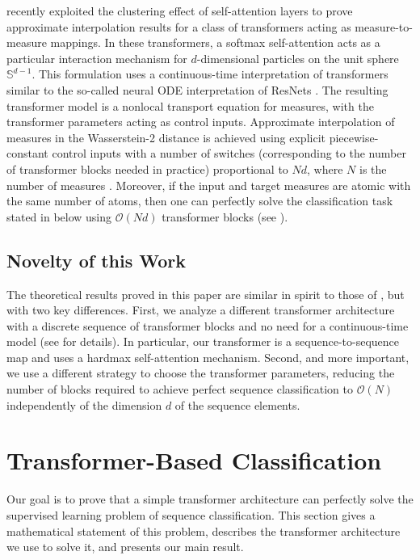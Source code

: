 \documentclass[11pt,a4paper]{amsart}
\begin{document}
\citet{geshkovski2024measure} recently exploited the clustering effect of self-attention layers to prove approximate interpolation results for a class of transformers acting as measure-to-measure mappings. In these transformers, a softmax self-attention acts as a particular interaction mechanism for $d$-dimensional particles on the unit sphere $\mathbb{S}^{d-1}$. This formulation uses a continuous-time interpretation of transformers similar to the so-called neural ODE interpretation of ResNets \cite{Weinan2017APO,NODES2018}. The resulting transformer model is a nonlocal transport equation for measures, with the transformer parameters acting as control inputs. Approximate interpolation of measures in the Wasserstein-2 distance is achieved using explicit piecewise-constant control inputs with a number of switches (corresponding to the number of transformer blocks needed in practice) proportional to $Nd$, where $N$ is the number of measures \citep[Theorem~1.1]{geshkovski2024measure}. Moreover, if the input and target measures are atomic with the same number of atoms, then one can perfectly solve the classification task stated in  below using $\mathcal{O}(Nd)$ transformer blocks (see \cite[\S1.4.2]{geshkovski2024measure}).
%
\subsection{Novelty of this Work}
The theoretical results proved in this paper are similar in spirit to those of \citet{geshkovski2024measure}, but with two key differences. First, we analyze a different transformer architecture with a discrete sequence of transformer blocks and no need for a continuous-time model (see  for details). In particular, our transformer is a sequence-to-sequence map and uses a hardmax self-attention mechanism. Second, and more important, we use a different strategy to choose the transformer parameters, reducing the number of blocks required to achieve perfect sequence classification to $\mathcal{O}(N)$ independently of the dimension $d$ of the sequence elements. 
%
\section{Transformer-Based Classification}
Our goal is to prove that a simple transformer architecture can perfectly solve the supervised learning problem of sequence classification. This section gives a mathematical statement of this problem, describes the transformer architecture we use to solve it, and presents our main result.
%
\end{document}
